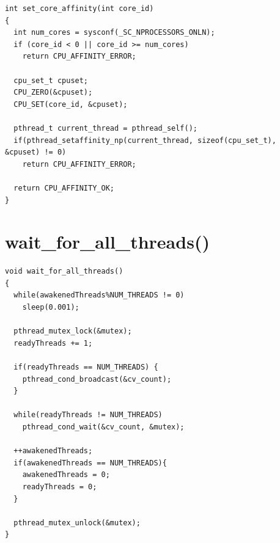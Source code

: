 
\begin{lstlisting}[caption=Set core affinity of calling thread]
int set_core_affinity(int core_id)
{
  int num_cores = sysconf(_SC_NPROCESSORS_ONLN);
  if (core_id < 0 || core_id >= num_cores)
    return CPU_AFFINITY_ERROR;

  cpu_set_t cpuset;
  CPU_ZERO(&cpuset);
  CPU_SET(core_id, &cpuset);

  pthread_t current_thread = pthread_self();
  if(pthread_setaffinity_np(current_thread, sizeof(cpu_set_t), &cpuset) != 0) 
    return CPU_AFFINITY_ERROR;

  return CPU_AFFINITY_OK;
}
\end{lstlisting}


\newpage
\section{wait\_for\_all\_threads()}
\label{app:code:wait_for_others}

\begin{lstlisting}[caption=Wait for other threads to join]
void wait_for_all_threads()
{
  while(awakenedThreads%NUM_THREADS != 0)
    sleep(0.001);

  pthread_mutex_lock(&mutex);
  readyThreads += 1;

  if(readyThreads == NUM_THREADS) {
    pthread_cond_broadcast(&cv_count);
  }

  while(readyThreads != NUM_THREADS)
    pthread_cond_wait(&cv_count, &mutex);

  ++awakenedThreads;
  if(awakenedThreads == NUM_THREADS){
    awakenedThreads = 0;
    readyThreads = 0;
  }

  pthread_mutex_unlock(&mutex);
}
\end{lstlisting}

\lstset{ %
  language=bash
}
\newpage
